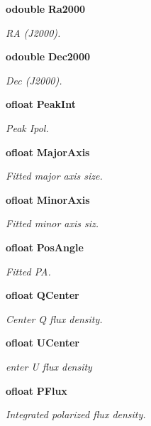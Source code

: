 \begin{CompactItemize}
{\bf odouble} {\bf Ra2000}
\begin{CompactList}\small\item\em RA (J2000). \item\end{CompactList}\item 
{\bf odouble} {\bf Dec2000}
\begin{CompactList}\small\item\em Dec (J2000). \item\end{CompactList}\item 
{\bf ofloat} {\bf Peak\-Int}
\begin{CompactList}\small\item\em Peak Ipol. \item\end{CompactList}\item 
{\bf ofloat} {\bf Major\-Axis}
\begin{CompactList}\small\item\em Fitted major axis size. \item\end{CompactList}\item 
{\bf ofloat} {\bf Minor\-Axis}
\begin{CompactList}\small\item\em Fitted minor axis siz. \item\end{CompactList}\item 
{\bf ofloat} {\bf Pos\-Angle}
\begin{CompactList}\small\item\em Fitted PA. \item\end{CompactList}\item 
{\bf ofloat} {\bf QCenter}
\begin{CompactList}\small\item\em Center Q flux density. \item\end{CompactList}\item 
{\bf ofloat} {\bf UCenter}
\begin{CompactList}\small\item\em enter U flux density \item\end{CompactList}\item 
{\bf ofloat} {\bf PFlux}
\begin{CompactList}\small\item\em Integrated polarized flux density. \item\end{CompactList}\item 

\end{CompactItemize}
